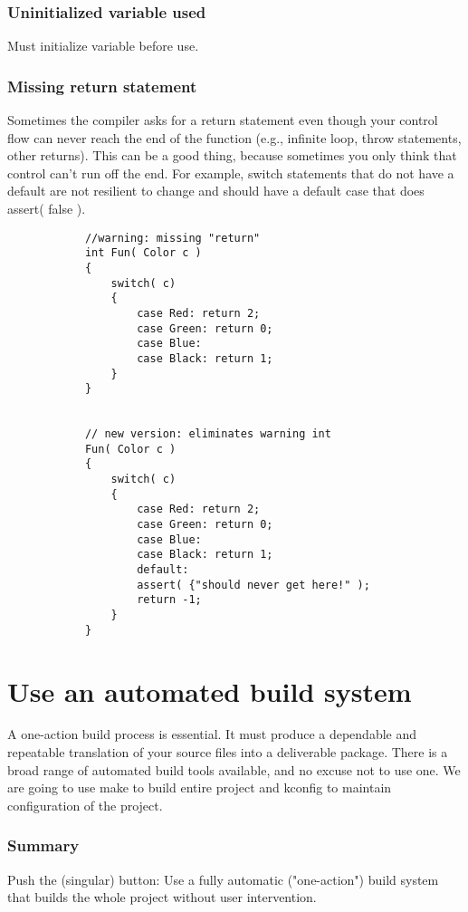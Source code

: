\documentclass[12pt,a4paper,oneside]{article}
\begin{document}
			\subsubsection{Uninitialized variable used}
			Must initialize variable before use.
			\subsubsection{Missing return statement}
			Sometimes the compiler asks for a return statement even though your control flow can never reach the end of the function (e.g., infinite loop, throw statements, other returns). This can be a good thing, because sometimes	you only think that control can't run off the end. For example, switch statements that do not have a default are not resilient to change and should have a default case that does assert( false ).
			\begin{verbatim}
			//warning: missing "return"
			int Fun( Color c ) 
			{
				switch( c) 
				{
					case Red: return 2;
					case Green: return 0;
					case Blue:
					case Black: return 1;
				}
			}
			
			
			// new version: eliminates warning int
			Fun( Color c ) 
			{
				switch( c) 
				{
					case Red: return 2;
					case Green: return 0;
					case Blue:
					case Black: return 1;
					default:
					assert( {"should never get here!" );
					return -1;
				}
			}
			\end{verbatim}
		
	\newpage
	\section{Use an automated build system}
	A one-action build process is essential. It must produce a dependable and repeatable translation of your source files into a deliverable package. There is a broad range of automated build tools available, and no excuse not to use one. We are going to use make to build entire project and kconfig to maintain configuration of the project.
		\subsubsection{Summary}
		Push the (singular) button: Use a fully automatic ("one-action") build system that builds the whole project without user intervention.
\end{document}
